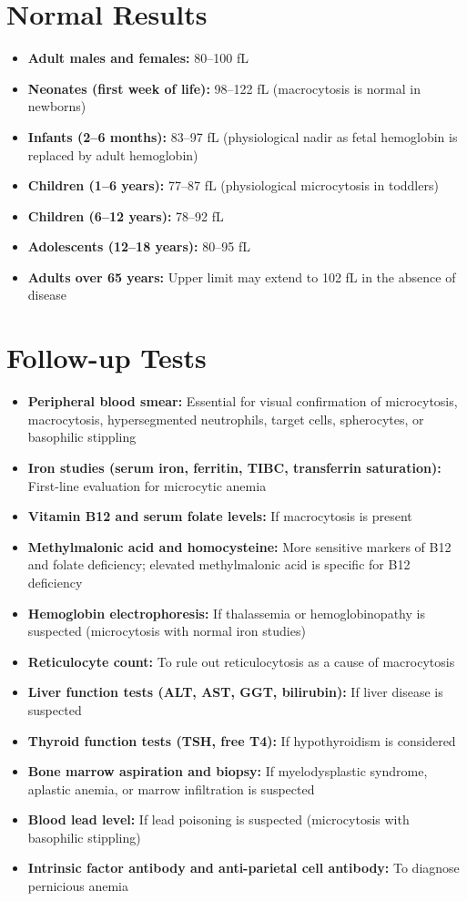 \section*{Normal Results}
\begin{itemize}
  \item \textbf{Adult males and females:} 80--100 fL
  \item \textbf{Neonates (first week of life):} 98--122 fL (macrocytosis is normal in newborns)
  \item \textbf{Infants (2--6 months):} 83--97 fL (physiological nadir as fetal hemoglobin is replaced by adult hemoglobin)
  \item \textbf{Children (1--6 years):} 77--87 fL (physiological microcytosis in toddlers)
  \item \textbf{Children (6--12 years):} 78--92 fL
  \item \textbf{Adolescents (12--18 years):} 80--95 fL
  \item \textbf{Adults over 65 years:} Upper limit may extend to 102 fL in the absence of disease
\end{itemize}

\section*{Follow-up Tests}
\begin{itemize}
  \item \textbf{Peripheral blood smear:} Essential for visual confirmation of microcytosis, macrocytosis, hypersegmented neutrophils, target cells, spherocytes, or basophilic stippling
  \item \textbf{Iron studies (serum iron, ferritin, TIBC, transferrin saturation):} First-line evaluation for microcytic anemia
  \item \textbf{Vitamin B12 and serum folate levels:} If macrocytosis is present
  \item \textbf{Methylmalonic acid and homocysteine:} More sensitive markers of B12 and folate deficiency; elevated methylmalonic acid is specific for B12 deficiency
  \item \textbf{Hemoglobin electrophoresis:} If thalassemia or hemoglobinopathy is suspected (microcytosis with normal iron studies)
  \item \textbf{Reticulocyte count:} To rule out reticulocytosis as a cause of macrocytosis
  \item \textbf{Liver function tests (ALT, AST, GGT, bilirubin):} If liver disease is suspected
  \item \textbf{Thyroid function tests (TSH, free T4):} If hypothyroidism is considered
  \item \textbf{Bone marrow aspiration and biopsy:} If myelodysplastic syndrome, aplastic anemia, or marrow infiltration is suspected
  \item \textbf{Blood lead level:} If lead poisoning is suspected (microcytosis with basophilic stippling)
  \item \textbf{Intrinsic factor antibody and anti-parietal cell antibody:} To diagnose pernicious anemia
\end{itemize}


